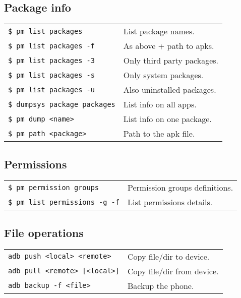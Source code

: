 \documentclass[11pt,landscape,a4paper]{article}
\begin{document}
\begin{multicols}{3}
\subsection{Package info}
\begin{tabular}{@{}ll@{}}
\texttt{\$ pm list packages} & List package names. \\
\texttt{\$ pm list packages -f} & As above + path to apks. \\
\texttt{\$ pm list packages -3} & Only third party packages. \\
\texttt{\$ pm list packages -s} & Only system packages. \\
\texttt{\$ pm list packages -u} & Also uninstalled packages. \\
\texttt{\$ dumpsys package packages} & List info on all apps. \\
\texttt{\$ pm dump <name>}   & List info on one package. \\
\texttt{\$ pm path <package>}  &  Path to the apk file.\\
\end{tabular}

\subsection{Permissions}
\begin{tabular}{@{}ll@{}}
\texttt{\$ pm permission groups}  &  Permission groups definitions. \\
\texttt{\$ pm list permissions -g -f}  &  List permissions details.\\
\end{tabular}

\subsection{File operations}
\begin{tabular}{@{}ll@{}}
\texttt{adb push <local> <remote>} & Copy file/dir to device.\\
\texttt{adb pull <remote> [<local>]}  & Copy file/dir from device.\\
\texttt{adb backup -f <file>}  & Backup the phone.\\
\end{tabular}


\end{multicols}
\end{document}
